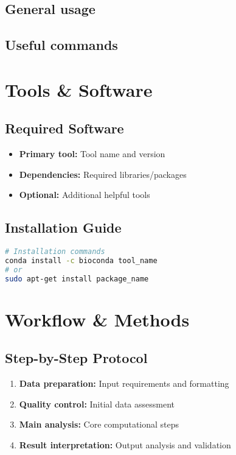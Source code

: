 \documentclass[a4paper,11pt]{article}
\begin{document}
\subsection{General usage}
\subsection{Useful commands}

\section{}


\section{Tools \& Software}

\subsection{Required Software}

\begin{itemize}
    \item \textbf{Primary tool:} Tool name and version
    \item \textbf{Dependencies:} Required libraries/packages
    \item \textbf{Optional:} Additional helpful tools
\end{itemize}

\subsection{Installation Guide}
\begin{lstlisting}[language=bash, caption=Software installation]
# Installation commands
conda install -c bioconda tool_name
# or
sudo apt-get install package_name
\end{lstlisting}

\section{Workflow \& Methods}

\subsection{Step-by-Step Protocol}

\begin{enumerate}
    \item \textbf{Data preparation:} Input requirements and formatting
    \item \textbf{Quality control:} Initial data assessment
    \item \textbf{Main analysis:} Core computational steps
    \item \textbf{Result interpretation:} Output analysis and validation
\end{enumerate}
\end{document}
